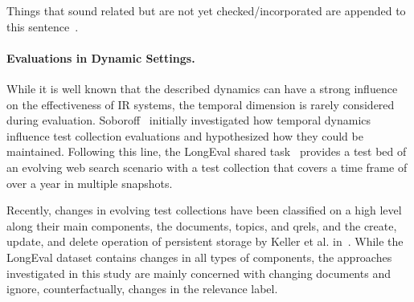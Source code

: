 Things that sound related but are not yet checked/incorporated are appended to this sentence~\cite{li:2022}.

\paragraph{Evaluations in Dynamic Settings.}
While it is well known that the described dynamics can have a strong influence on the effectiveness of IR systems, the temporal dimension is rarely considered during evaluation. Soboroff~\cite{DBLP:conf/sigir/Soboroff06} initially investigated how temporal dynamics influence test collection evaluations and hypothesized how they could be maintained. Following this line, the LongEval shared task~\cite{DBLP:conf/clef/AlkhalifaBDEAFG24,alkhalifa:2023} provides a test bed of an evolving web search scenario with a test collection that covers a time frame of over a year in multiple snapshots.

Recently, changes in evolving test collections have been classified on a high level along their main components, the documents, topics, and qrels, and the create, update, and delete operation of persistent storage by Keller et al. in~\cite{keller:2024}. While the LongEval dataset contains changes in all types of components, the approaches investigated in this study are mainly concerned with changing documents and ignore, counterfactually, changes in the relevance label.
